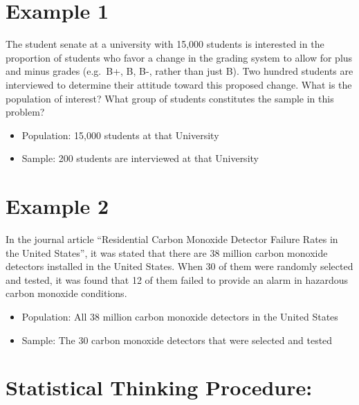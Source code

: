 \documentclass[]{book}
\providecommand{\tightlist}{%
  \setlength{\itemsep}{0pt}\setlength{\parskip}{0pt}}
\begin{document}
\hypertarget{example-1}{%
\section{Example 1}\label{example-1}}

The student senate at a university with 15,000 students is interested in the proportion of students who favor a change in the grading system to allow for plus and minus grades (e.g.~B+, B, B-, rather than just B). Two hundred students are interviewed to determine their attitude toward this proposed change. What is the population of interest? What group of students constitutes the sample in this problem?

\begin{itemize}
\tightlist
\item
  Population: 15,000 students at that University
\item
  Sample: 200 students are interviewed at that University
\end{itemize}

\hypertarget{example-2}{%
\section{Example 2}\label{example-2}}

In the journal article ``Residential Carbon Monoxide Detector Failure Rates in the United States'', it was stated that there are 38 million carbon monoxide detectors installed in the United States. When 30 of them were randomly selected and tested, it was found that 12 of them failed to provide an alarm in hazardous carbon monoxide conditions.

\begin{itemize}
\tightlist
\item
  Population: All 38 million carbon monoxide detectors in the United States\\
\item
  Sample: The 30 carbon monoxide detectors that were selected and tested
\end{itemize}

\hypertarget{statistical-thinking-procedure}{%
\section{Statistical Thinking Procedure:}\label{statistical-thinking-procedure}}
\end{document}
